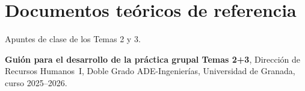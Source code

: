 \section*{Documentos teóricos de referencia}

\begin{enumerate}[label={[\arabic*]}, resume]

  \item Apuntes de clase de los Temas 2 y 3.

  \item \textbf{Guión para el desarrollo de la práctica grupal Temas 2+3},
        Dirección de Recursos Humanos~I, Doble Grado ADE-Ingenierías,
        Universidad de Granada, curso 2025--2026.

\end{enumerate}

\endinput
